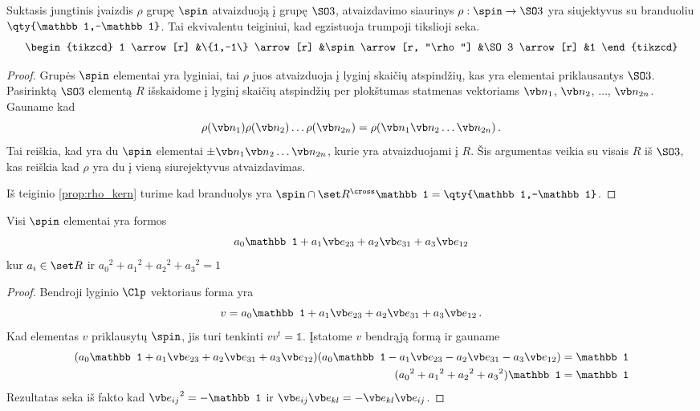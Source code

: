 \begin{proposition}
	Suktasis jungtinis įvaizdis $\rho$ grupę $\spin$ atvaizduoją į grupę $\SO3$,
	atvaizdavimo siaurinys $\rho : \spin \to \SO3$ yra siujektyvus
	su branduoliu $\qty{\mathbb1,-\mathbb1}$.
	Tai ekvivalentu teiginiui, kad egzistuoja trumpoji tikslioji seka.
	\begin{equation}
		\begin{tikzcd}
			1 \arrow[r] &\{1,-1\} \arrow[r]	&\spin \arrow[r, "\rho"] &\SO3 \arrow[r] &1
		\end{tikzcd}
	\end{equation}
\end{proposition}
\begin{proof}
	Grupės $\spin$ elementai yra lyginiai,
	tai $\rho$ juos atvaizduoja į lyginį skaičių atspindžių,
	kas yra elementai priklausantys $\SO3$.
	Pasirinktą $\SO3$ elementą $R$ išskaidome į lyginį skaičių atspindžių
	per plokštumas statmenas vektoriams $\vb n_1$, $\vb n_2$, $\dots$, $\vb n_{2n}$.
	Gauname kad
	\begin{equation}
		\rho(\vb n_1)\rho(\vb n_2)\dots\rho(\vb n_{2n})
		=\rho(\vb n_1 \vb n_2 \dots \vb n_{2n})
		\,.
	\end{equation}
	Tai reiškia, kad yra du $\spin$ elementai $\pm \vb n_1 \vb n_2 \dots \vb n_{2n}$,
	kurie yra atvaizduojami į $R$.
	Šis argumentas veikia su visais $R$ iš $\SO3$,
	kas reiškia kad $\rho$ yra du į vieną siurejektyvus atvaizdavimas.

	Iš teiginio \ref{prop:rho_kern} turime kad branduolys yra
	$\spin \cap \set R^{\cross} \mathbb1 = \qty{\mathbb1,-\mathbb1}$.
\end{proof}

\begin{proposition}
	Visi $\spin$ elementai yra formos
	\begin{equation}
		a_0 \mathbb1 
		+ a_1 \vb e_{23}
		+ a_2 \vb e_{31}
		+ a_3 \vb e_{12}
	\end{equation}
	kur $a_i \in \set R$ ir
	$
	{a_0}^2
	+{a_1}^2
	+{a_2}^2
	+{a_3}^2
	= 1
	$
\end{proposition}
\begin{proof}
	Bendroji lyginio $\Clp$ vektoriaus forma yra
	\begin{equation}
		v = 
		  a_0 \mathbb1 
		+ a_1 \vb e_{23}
		+ a_2 \vb e_{31}
		+ a_3 \vb e_{12}
		\,.
	\end{equation}
	Kad elementas $v$ priklausytų $\spin$, jis turi tenkinti
	$vv^t = \mathbb1$.
	Įstatome $v$ bendrąją formą ir gauname
	\begin{equation}
		\begin{aligned}
			(a_0 \mathbb1 
			+ a_1 \vb e_{23}
			+ a_2 \vb e_{31}
			+ a_3 \vb e_{12})
			(a_0 \mathbb1 
			- a_1 \vb e_{23}
			- a_2 \vb e_{31}
			- a_3 \vb e_{12})
			&= \mathbb1
			\\
			({a_0}^2
			+{a_1}^2
			+{a_2}^2
			+{a_3}^2)
			\mathbb1
			&= \mathbb1
		\end{aligned}
	\end{equation}
	Rezultatas seka iš fakto kad ${\vb e_{ij}}^2 = -\mathbb1$ 
	ir $\vb e_{ij} \vb e_{kl} = - \vb e_{kl} \vb e_{ij}$.
\end{proof}





